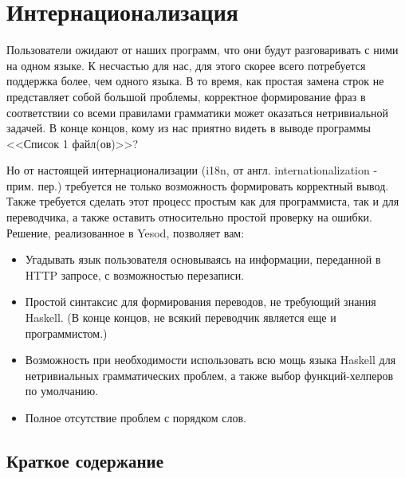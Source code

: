 \chapter{Интернационализация} %

Пользователи ожидают от наших программ, что они будут разговаривать с ними на одном языке. К несчастью для нас, для этого скорее всего потребуется поддержка более, чем одного языка. В то время, как простая замена строк не представляет собой большой проблемы, корректное формирование фраз в соответствии со всеми правилами грамматики может оказаться нетривиальной задачей. В конце концов, кому из нас приятно видеть в выводе программы <<Список 1 файл(ов)>>?

Но от настоящей интернационализации (i18n, от англ. internationalization - прим. пер.) требуется не только возможность формировать корректный вывод. Также требуется сделать этот процесс простым как для программиста, так и для переводчика, а также оставить относительно простой проверку на ошибки. Решение, реализованное в Yesod, позволяет вам:

\begin{itemize}
  \item Угадывать язык пользователя основываясь на информации, переданной в HTTP запросе, с возможностью перезаписи.
  \item Простой синтаксис для формирования переводов, не требующий знания Haskell. (В конце концов, не всякий переводчик является еще и программистом.)
  \item Возможность при необходимости использовать всю мощь языка Haskell для нетривиальных грамматических проблем, а также выбор функций-хелперов по умолчанию. %
  \item Полное отсутствие проблем с порядком слов. %
\end{itemize}

\section{Краткое содержание} %

